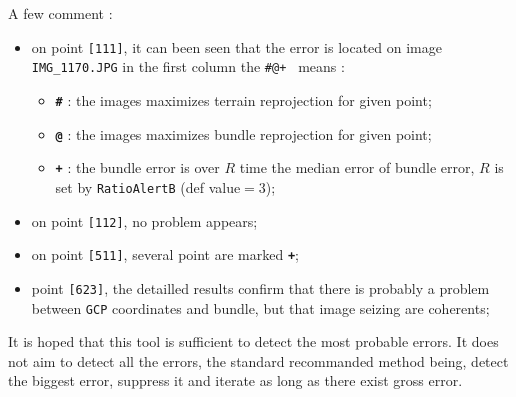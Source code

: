 A few comment :

\begin{itemize}
   \item on point  {\tt [111]}, it can been seen that the error is located on image {\tt IMG\_1170.JPG}  
         in the first column the {\tt \#@+ } means :
    \begin{itemize}
         \item {\bf \tt \#} : the images maximizes terrain reprojection for given point;
         \item {\bf \tt @} : the images maximizes bundle reprojection for given point;
         \item {\bf \tt +} : the bundle error is over $R$ time the median error of bundle error,
              $R$ is set by {\tt RatioAlertB}  (def value$=3$);
    \end{itemize}
   \item on point  {\tt [112]}, no problem appears;
   \item on point  {\tt [511]}, several point are marked  {\bf \tt +};
   \item point  {\tt [623]}, the detailled results confirm that there is probably a problem between  {\tt GCP}
         coordinates and bundle,  but that image seizing are coherents;
\end{itemize}

It is hoped that this tool is sufficient to detect the most probable errors. It does
not aim to detect all the errors, the standard recommanded method being, detect
the biggest error, suppress it and iterate as long as there exist gross error.







